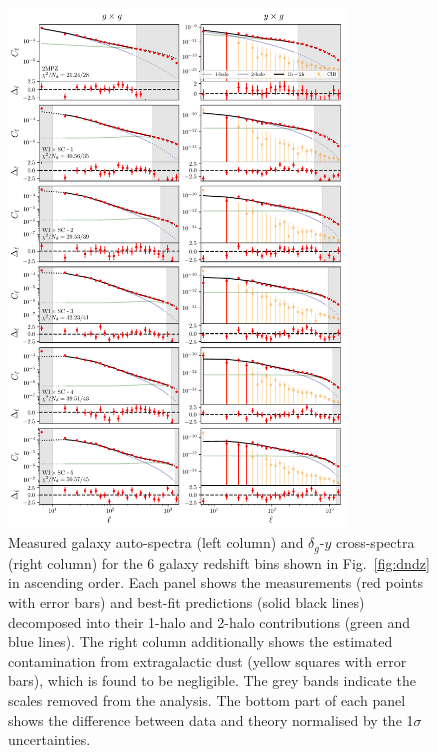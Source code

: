 \documentclass[useAMS,usenatbib]{mn2e}
\begin{document}
  \begin{figure}
    \centering
    \includegraphics[width=0.8\textwidth]{fits.pdf}
    \caption{Measured galaxy auto-spectra (left column) and $\delta_g$-$y$ cross-spectra (right column) for the 6 galaxy redshift bins shown in Fig.\!~\ref{fig:dndz} in ascending order. Each panel shows the measurements (red points with error bars) and best-fit predictions (solid black lines) decomposed into their 1-halo and 2-halo contributions (green and blue lines). The right column additionally shows the estimated contamination from extragalactic dust (yellow squares with error bars), which is found to be negligible. The grey bands indicate the scales removed from the analysis. The bottom part of each panel shows the difference between data and theory normalised by the 1$\sigma$ uncertainties.}
    \label{fig:cls}
  \end{figure}
\end{document}

